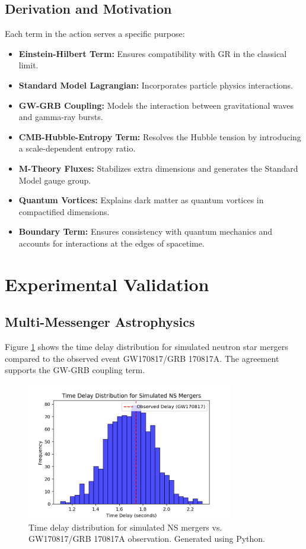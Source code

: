 \documentclass[12pt,a4paper]{article}
\begin{document}
\subsection{Derivation and Motivation}
Each term in the action serves a specific purpose:
\begin{itemize}
    \item \textbf{Einstein-Hilbert Term:} Ensures compatibility with GR in the classical limit.
    \item \textbf{Standard Model Lagrangian:} Incorporates particle physics interactions.
    \item \textbf{GW-GRB Coupling:} Models the interaction between gravitational waves and gamma-ray bursts.
    \item \textbf{CMB-Hubble-Entropy Term:} Resolves the Hubble tension by introducing a scale-dependent entropy ratio.
    \item \textbf{M-Theory Fluxes:} Stabilizes extra dimensions and generates the Standard Model gauge group.
    \item \textbf{Quantum Vortices:} Explains dark matter as quantum vortices in compactified dimensions.
    \item \textbf{Boundary Term:} Ensures consistency with quantum mechanics and accounts for interactions at the edges of spacetime.
\end{itemize}

\section{Experimental Validation}
\subsection{Multi-Messenger Astrophysics}
Figure \ref{fig:gw_grb_delay} shows the time delay distribution for simulated neutron star mergers compared to the observed event GW170817/GRB 170817A. The agreement supports the GW-GRB coupling term.

\begin{figure}[h]
\centering
\includegraphics[width=0.8\textwidth]{gw_grb_delay.png}
\caption{Time delay distribution for simulated NS mergers vs. GW170817/GRB 170817A observation. Generated using Python.}
\label{fig:gw_grb_delay}
\end{figure}
\end{document}

